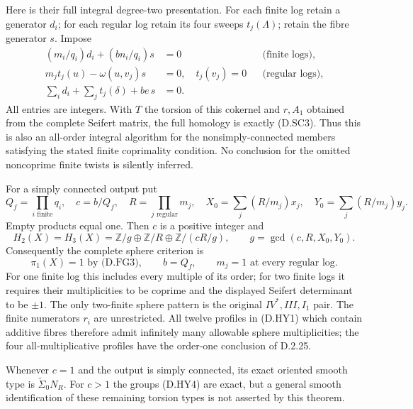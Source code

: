 Here is their full integral degree-two presentation. For each finite
log retain a generator $d_i$; for each regular log retain its four
sweeps $t_j(\Lambda)$; retain the fibre generator $s$. Impose
\[
\begin{aligned}
 (m_i/q_i)d_i+(bn_i/q_i)s&=0 &&\text{(finite logs)},\\
 m_jt_j(u)-\omega(u,v_j)s&=0,\quad t_j(v_j)=0
                                      &&\text{(regular logs)},\\
 \sum_i d_i+\sum_jt_j(\delta)+be\,s&=0. &
\end{aligned}                                                 \tag{D.HY3}
\]
All entries are integers. With $T$ the torsion of this cokernel and
$r,A_1$ obtained from the complete Seifert matrix, the full homology
is exactly (D.SC3). Thus this is also an all-order integral algorithm
for the nonsimply-connected members satisfying the stated finite
coprimality condition. No conclusion for the omitted noncoprime
finite twists is silently inferred.

For a simply connected output put
\[
 Q_f=\prod_{i\text{ finite}}q_i,\quad c=b/Q_f,\quad
 R=\prod_{j\text{ regular}}m_j,
 \quad X_0=\sum_j(R/m_j)x_j,\quad Y_0=\sum_j(R/m_j)y_j.
\]
Empty products equal one. Then $c$ is a positive integer and
\[
 H_2(X)=H_3(X)=
 \mathbb Z/g\oplus\mathbb Z/R\oplus\mathbb Z/(cR/g),
 \qquad g=\gcd(c,R,X_0,Y_0).                                \tag{D.HY4}
\]
Consequently the complete sphere criterion is
\[
 \pi_1(X)=1\text{ by (D.FG3)},\qquad b=Q_f,
 \qquad m_j=1\text{ at every regular log}.                  \tag{D.HY5}
\]
For one finite log this includes every multiple of its order; for
two finite logs it requires their multiplicities to be coprime and
the displayed Seifert determinant to be $\pm1$. The only two-finite
sphere pattern is the original $IV^*,III,I_1$ pair. The finite
numerators $r_i$ are unrestricted. All twelve profiles in (D.HY1)
which contain additive fibres therefore admit infinitely many
allowable sphere multiplicities; the four all-multiplicative
profiles have the order-one conclusion of D.2.25.

Whenever $c=1$ and the output is simply connected, its exact oriented
smooth type is $\widetilde\Sigma_0N_R$. For $c>1$ the groups (D.HY4)
are exact, but a general smooth identification of these remaining
torsion types is not asserted by this theorem.

